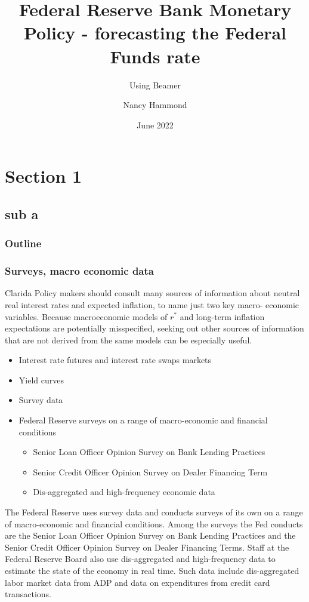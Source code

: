 \documentclass{beamer}
\title{Federal Reserve Bank Monetary Policy - forecasting the Federal Funds rate}
\subtitle{Using Beamer}
\author{Nancy Hammond }
\institute{University of Chicago}
\date{June 2022}
\begin{document}
\begin{frame}
\titlepage
\end{frame}
%
\section{Section 1}
\subsection{sub a}

\begin{frame}
\frametitle{Outline}
\tableofcontents
\end{frame}
%

\begin{frame}
\frametitle{Surveys, macro economic data}
Clarida Policy makers should consult many sources of information about neutral real interest rates and expected inflation, to name just two key macro-
economic variables. Because macroeconomic models of $r^\ast$ and long-term inflation expectations are potentially misspecified, seeking out other sources of information that are not derived from the
same models can be especially useful. 
\begin{itemize}
    \item Interest rate futures and interest rate swaps markets
    \item Yield curves
\end{itemize}
\begin{itemize}
    \item Survey data 
    \item Federal Reserve surveys on a range of macro-economic and financial conditions
       \begin{itemize}
       \item Senior Loan Officer Opinion Survey on Bank Lending Practices
       \item Senior Credit Officer Opinion Survey on Dealer Financing Term
       \item Dis-aggregated and high-frequency economic data
       \end{itemize}
\end{itemize}
The Federal Reserve uses survey data and conducts surveys of its own on a range of macro-economic and financial conditions. Among the surveys the Fed conducts are the Senior Loan Officer Opinion Survey on Bank Lending Practices and the Senior Credit Officer Opinion Survey on Dealer Financing Terms. Staff at the Federal Reserve Board also use
dis-aggregated and high-frequency data to estimate the state of the economy in real time. Such data include dis-aggregated labor market data from ADP and data on expenditures from credit card transactions.
\end{frame}
\end{document}

